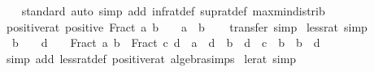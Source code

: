 \begin{isabellebody}
\isanewline
%
\isadelimproof
\ \ %
\endisadelimproof
%
\isatagproof
{}\isamarkupfalse%
\ standard\ {\isacharparenleft}{\kern0pt}auto\ simp\ add{\isacharcolon}{\kern0pt}\ inf{\isacharunderscore}{\kern0pt}rat{\isacharunderscore}{\kern0pt}def\ sup{\isacharunderscore}{\kern0pt}rat{\isacharunderscore}{\kern0pt}def\ max{\isacharunderscore}{\kern0pt}min{\isacharunderscore}{\kern0pt}distrib{}{\isacharparenright}{\kern0pt}%
\endisatagproof
{\isafoldproof}%
%
\isadelimproof
\isanewline
%
\endisadelimproof
\isanewline
{}\isamarkupfalse%
\isanewline
\isanewline
{}\isamarkupfalse%
\ positive{\isacharunderscore}{\kern0pt}rat{\isacharcolon}{\kern0pt}\ {\isachardoublequoteopen}positive\ {\isacharparenleft}{\kern0pt}Fract\ a\ b{\isacharparenright}{\kern0pt}\ {\isasymlongleftrightarrow}\ {}\ {\isacharless}{\kern0pt}\ a\ {\isacharasterisk}{\kern0pt}\ b{\isachardoublequoteclose}\isanewline
%
\isadelimproof
\ \ %
\endisadelimproof
%
\isatagproof
{}\isamarkupfalse%
\ transfer\ simp%
\endisatagproof
{\isafoldproof}%
%
\isadelimproof
\isanewline
%
\endisadelimproof
\isanewline
{}\isamarkupfalse%
\ less{\isacharunderscore}{\kern0pt}rat\ {\isacharbrackleft}{\kern0pt}simp{\isacharbrackright}{\kern0pt}{\isacharcolon}{\kern0pt}\isanewline
\ \ {\isachardoublequoteopen}b\ {\isasymnoteq}\ {}\ {\isasymLongrightarrow}\ d\ {\isasymnoteq}\ {}\ {\isasymLongrightarrow}\ Fract\ a\ b\ {\isacharless}{\kern0pt}\ Fract\ c\ d\ {\isasymlongleftrightarrow}\ {\isacharparenleft}{\kern0pt}a\ {\isacharasterisk}{\kern0pt}\ d{\isacharparenright}{\kern0pt}\ {\isacharasterisk}{\kern0pt}\ {\isacharparenleft}{\kern0pt}b\ {\isacharasterisk}{\kern0pt}\ d{\isacharparenright}{\kern0pt}\ {\isacharless}{\kern0pt}\ {\isacharparenleft}{\kern0pt}c\ {\isacharasterisk}{\kern0pt}\ b{\isacharparenright}{\kern0pt}\ {\isacharasterisk}{\kern0pt}\ {\isacharparenleft}{\kern0pt}b\ {\isacharasterisk}{\kern0pt}\ d{\isacharparenright}{\kern0pt}{\isachardoublequoteclose}\isanewline
%
\isadelimproof
\ \ %
\endisadelimproof
%
\isatagproof
{}\isamarkupfalse%
\ {\isacharparenleft}{\kern0pt}simp\ add{\isacharcolon}{\kern0pt}\ less{\isacharunderscore}{\kern0pt}rat{\isacharunderscore}{\kern0pt}def\ positive{\isacharunderscore}{\kern0pt}rat\ algebra{\isacharunderscore}{\kern0pt}simps{\isacharparenright}{\kern0pt}%
\endisatagproof
{\isafoldproof}%
%
\isadelimproof
\isanewline
%
\endisadelimproof
\isanewline
{}\isamarkupfalse%
\ le{\isacharunderscore}{\kern0pt}rat\ {\isacharbrackleft}{\kern0pt}simp{\isacharbrackright}{\kern0pt}{\isacharcolon}{\kern0pt}\isanewline

\end{isabellebody}
